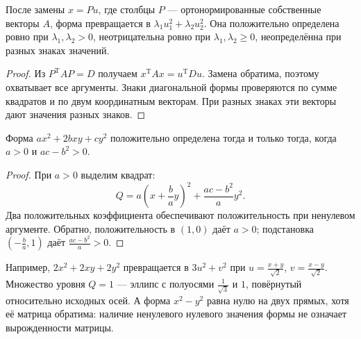\begin{theorem}\label{thm:legacy-c27-5}
После замены \(x=Pu\), где столбцы \(P\) — ортонормированные собственные векторы \(A\), форма превращается в \(\lambda_1u_1^2+\lambda_2u_2^2\). Она положительно определена ровно при \(\lambda_1,\lambda_2>0\), неотрицательна ровно при \(\lambda_1,\lambda_2\ge0\), неопределённа при разных знаках значений.
\end{theorem}
\begin{proof}
Из \(P^{\mathrm T}AP=D\) получаем \(x^{\mathrm T}Ax=u^{\mathrm T}Du\). Замена обратима, поэтому охватывает все аргументы. Знаки диагональной формы проверяются по сумме квадратов и по двум координатным векторам. При разных знаках эти векторы дают значения разных знаков.
\end{proof}
\begin{theorem}\label{thm:legacy-c27-6}
Форма \(ax^2+2bxy+cy^2\) положительно определена тогда и только тогда, когда \(a>0\) и \(ac-b^2>0\).
\end{theorem}
\begin{proof}
При \(a>0\) выделим квадрат:
\[
Q=a\left(x+\frac ba y\right)^2+\frac{ac-b^2}{a}y^2.
\]
Два положительных коэффициента обеспечивают положительность при ненулевом аргументе. Обратно, положительность в \((1,0)\) даёт \(a>0\); подстановка \((-\frac ba,1)\) даёт \(\frac{ac-b^2}{a}>0\).
\end{proof}
Например, \(2x^2+2xy+2y^2\) превращается в \(3u^2+v^2\) при \(u=\frac{x+y}{\sqrt2}\), \(v=\frac{x-y}{\sqrt2}\). Множество уровня \(Q=1\) — эллипс с полуосями \(\frac1{\sqrt3}\) и \(1\), повёрнутый относительно исходных осей. А форма \(x^2-y^2\) равна нулю на двух прямых, хотя её матрица обратима: наличие ненулевого нулевого значения формы не означает вырожденности матрицы.

